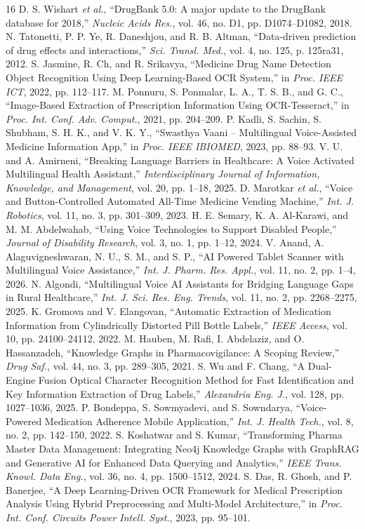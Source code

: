 \begin{thebibliography}{16}
 D. S. Wishart \emph{et al.}, ``DrugBank 5.0: A major update to the DrugBank database for 2018,'' \emph{Nucleic Acids Res.}, vol. 46, no. D1, pp. D1074--D1082, 2018.
 N. Tatonetti, P. P. Ye, R. Daneshjou, and R. B. Altman, ``Data-driven prediction of drug effects and interactions,'' \emph{Sci. Transl. Med.}, vol. 4, no. 125, p. 125ra31, 2012.
 S. Jasmine, R. Ch, and R. Srikavya, ``Medicine Drug Name Detection Object Recognition Using Deep Learning-Based OCR System,'' in \emph{Proc. IEEE ICT}, 2022, pp. 112--117.
 M. Ponnuru, S. Ponmalar, L. A., T. S. B., and G. C., ``Image-Based Extraction of Prescription Information Using OCR-Tesseract,'' in \emph{Proc. Int. Conf. Adv. Comput.}, 2021, pp. 204--209.
 P. Kadli, S. Sachin, S. Shubham, S. H. K., and V. K. Y., ``Swasthya Vaani -- Multilingual Voice-Assisted Medicine Information App,'' in \emph{Proc. IEEE IBIOMED}, 2023, pp. 88--93.
 V. U. and A. Amirneni, ``Breaking Language Barriers in Healthcare: A Voice Activated Multilingual Health Assistant,'' \emph{Interdisciplinary Journal of Information, Knowledge, and Management}, vol. 20, pp. 1--18, 2025.
 D. Marotkar \emph{et al.}, ``Voice and Button-Controlled Automated All-Time Medicine Vending Machine,'' \emph{Int. J. Robotics}, vol. 11, no. 3, pp. 301--309, 2023.
 H. E. Semary, K. A. Al-Karawi, and M. M. Abdelwahab, ``Using Voice Technologies to Support Disabled People,'' \emph{Journal of Disability Research}, vol. 3, no. 1, pp. 1--12, 2024.
 V. Anand, A. Alaguvigneshwaran, N. U., S. M., and S. P., ``AI Powered Tablet Scanner with Multilingual Voice Assistance,'' \emph{Int. J. Pharm. Res. Appl.}, vol. 11, no. 2, pp. 1--4, 2026.
 N. Algondi, ``Multilingual Voice AI Assistants for Bridging Language Gaps in Rural Healthcare,'' \emph{Int. J. Sci. Res. Eng. Trends}, vol. 11, no. 2, pp. 2268--2275, 2025.
 K. Gromova and V. Elangovan, ``Automatic Extraction of Medication Information from Cylindrically Distorted Pill Bottle Labels,'' \emph{IEEE Access}, vol. 10, pp. 24100--24112, 2022.
 M. Hauben, M. Rafi, I. Abdelaziz, and O. Hassanzadeh, ``Knowledge Graphs in Pharmacovigilance: A Scoping Review,'' \emph{Drug Saf.}, vol. 44, no. 3, pp. 289--305, 2021.
 S. Wu and F. Chang, ``A Dual-Engine Fusion Optical Character Recognition Method for Fast Identification and Key Information Extraction of Drug Labels,'' \emph{Alexandria Eng. J.}, vol. 128, pp. 1027--1036, 2025.
 P. Bondeppa, S. Sowmyadevi, and S. Sowndarya, ``Voice-Powered Medication Adherence Mobile Application,'' \emph{Int. J. Health Tech.}, vol. 8, no. 2, pp. 142--150, 2022.
 S. Koshatwar and S. Kumar, ``Transforming Pharma Master Data Management: Integrating Neo4j Knowledge Graphs with GraphRAG and Generative AI for Enhanced Data Querying and Analytics,'' \emph{IEEE Trans. Knowl. Data Eng.}, vol. 36, no. 4, pp. 1500--1512, 2024.
 S. Das, R. Ghosh, and P. Banerjee, ``A Deep Learning-Driven OCR Framework for Medical Prescription Analysis Using Hybrid Preprocessing and Multi-Model Architecture,'' in \emph{Proc. Int. Conf. Circuits Power Intell. Syst.}, 2023, pp. 95--101.
\end{thebibliography}